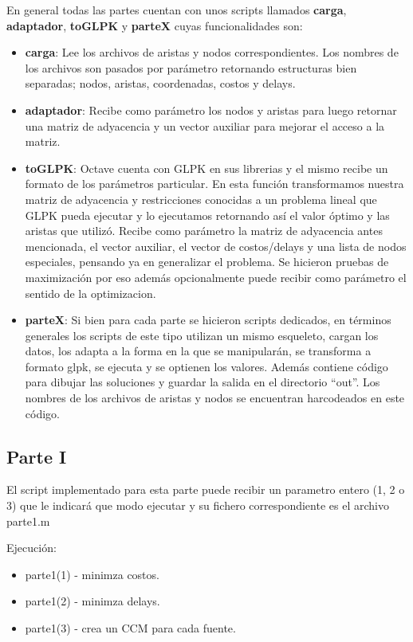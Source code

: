 \documentclass{extarticle}
\begin{document}
En general todas las partes cuentan con unos scripts llamados \textbf{carga}, \textbf{adaptador}, \textbf{toGLPK} y \textbf{parteX} cuyas funcionalidades son:
\begin{itemize}
	\item \textbf{carga}:  Lee los archivos de aristas y nodos correspondientes. Los nombres de los archivos son pasados por parámetro retornando estructuras bien separadas; nodos, aristas, coordenadas, costos y delays.
	\item \textbf{adaptador}: Recibe como parámetro los nodos y aristas para luego retornar una matriz de adyacencia y un vector auxiliar para mejorar el acceso a la matriz.
	\item \textbf{toGLPK}: Octave cuenta con GLPK en sus librerias y el mismo recibe un formato de los parámetros particular. En esta función transformamos nuestra matriz de adyacencia y restricciones conocidas a un problema lineal que GLPK pueda ejecutar y lo ejecutamos retornando así el valor óptimo y las aristas que utilizó. Recibe como parámetro la matriz de adyacencia antes mencionada, el vector auxiliar, el vector de costos/delays y una lista de nodos especiales, pensando ya en generalizar el problema. Se hicieron pruebas de maximización por eso además opcionalmente puede recibir como parámetro el sentido de la optimizacion.
	\item \textbf{parteX}: Si bien para cada parte se hicieron scripts dedicados, en términos generales los scripts de este tipo utilizan un mismo esqueleto, cargan los datos, los adapta a la forma en la que se manipularán, se transforma a formato glpk, se ejecuta y se optienen los valores. Además contiene código para dibujar las soluciones y guardar la salida en el directorio ``out''. Los nombres de los archivos de aristas y nodos se encuentran harcodeados en este código.
\end{itemize}
\newpage
\subsection{Parte I}
El script implementado para esta parte puede recibir un parametro entero (1, 2 o 3) que le indicará que modo ejecutar y su fichero correspondiente es el archivo parte1.m

Ejecución:
\begin{itemize}
	\item parte1(1) - minimza costos.
	\item parte1(2) - minimza delays.
	\item parte1(3) - crea un CCM para cada fuente.
\end{itemize}
\end{document}
